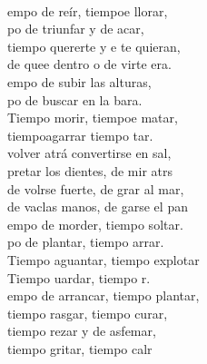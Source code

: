 \documentclass[12pt]{article}
\begin{document}
\begin{multicols*}{2}
\begin{cancion}%
	     \\
	empo de reír, tiempoe llorar,\\
	po de triunfar y de acar,\\
	tiempo  quererte y e te quieran,\\
	de quee dentro o de virte era.\\
\jump
	empo de subir las alturas,\\
	po de buscar en la bara.\\
	Tiempo  morir, tiempoe matar,\\
	tiempoagarrar tiempo  tar.\\
\jump
	 volver atrá convertirse en sal,\\
	pretar los dientes, de mir atrs\\
	de volrse fuerte, de grar al mar,\\
	de vaclas manos, de garse el pan\\
\jump
	empo de morder, tiempo  soltar.\\
	po de plantar, tiempo  arrar.\\
	Tiempo  aguantar, tiempo  explotar\\
	Tiempo uardar, tiempo  r.\\
\jump
	empo de arrancar, tiempo  plantar,\\
	tiempo  rasgar, tiempo curar,\\
	tiempo  rezar y de asfemar,\\
	tiempo  gritar, tiempo  calr\\\jump\\

\end{cancion}
\end{multicols*}
\end{document}
